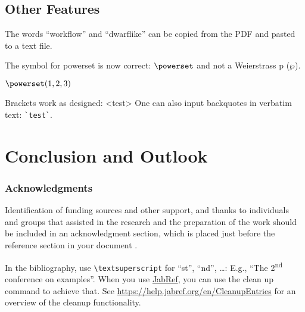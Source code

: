 \documentclass[runningheads,a4paper,english]{llncs}[2022/01/12]
\begin{document}
\subsection{Other Features}

\begin{ltgexample}
The words \enquote{workflow} and \enquote{dwarflike} can be copied from the PDF and pasted to a text file.
\end{ltgexample}

\begin{ltgexample}
The symbol for powerset is now correct: $\powerset$ and not a Weierstrass p ($\wp$).

$\powerset({1,2,3})$
\end{ltgexample}

\begin{ltgexample}
Brackets work as designed:
<test>
One can also input backquotes in verbatim text: \verb|`test`|.
\end{ltgexample}


\section{Conclusion and Outlook}
\label{sec:outlook}
\lipsum[1-2]

\subsubsection*{Acknowledgments}

Identification of funding sources and other support, and thanks to individuals and groups that assisted in the research and the preparation of the work should be included in an acknowledgment section, which is placed just before the reference section in your document \cite{acmart}.


In the bibliography, use \texttt{\textbackslash textsuperscript} for \enquote{st}, \enquote{nd}, \ldots:
E.g., \enquote{The 2\textsuperscript{nd} conference on examples}.
When you use \href{https://www.jabref.org}{JabRef}, you can use the clean up command to achieve that.
See \url{https://help.jabref.org/en/CleanupEntries} for an overview of the cleanup functionality.

\renewcommand{\bibsection}{\section*{References}} %

\begingroup
  \small %
  
\endgroup
\end{document}
